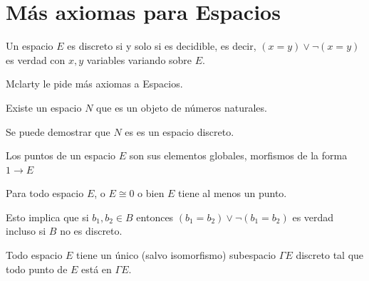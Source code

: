\begin{center}
\end{center}

\section{Más axiomas para Espacios}

\begin{definition}[label=def:discreto]
  Un espacio $E$ es discreto si y solo si es decidible, es decir, $(x=y) \lor \lnot(x = y)$ es verdad con $x,y$ variables
  variando sobre $E$.
\end{definition}

Mclarty le pide más axiomas a Espacios.

\begin{axioma}[label=ax:gds5]
Existe un espacio $N$ que es un objeto de números naturales.
\end{axioma}

Se puede demostrar que $N$ es es un espacio discreto.

\begin{definition}[label=puntos]
Los puntos de un espacio $E$ son sus elementos globales, morfismos de la forma $1\to E$
\end{definition}

\begin{axioma}[label=ax:gds6]
Para todo espacio $E$, o $E \cong  0 $ o bien $E$ tiene al menos un punto.
\end{axioma}

Esto implica que si $b_1, b_2\in B$ entonces $(b_1=b_2)\lor \lnot(b_1=b_2)$ es verdad incluso si $B$ no es discreto.

\begin{axioma}[label=ax:gds7]
Todo espacio $E$ tiene un único (salvo isomorfismo) subespacio $\Gamma E$ discreto tal que todo punto de $E$ está en $\Gamma E$. 
\end{axioma} 